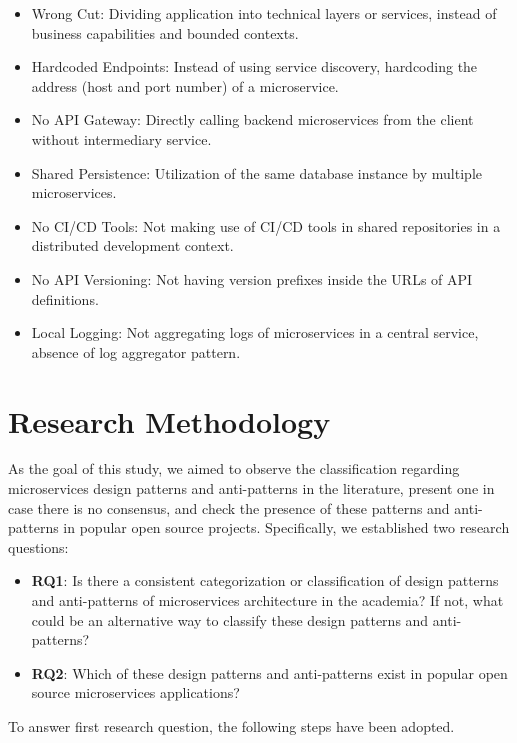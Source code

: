 \documentclass[11pt,a4paper,twocolumn]{article}
\begin{document}
\begin{itemize}
    \item Wrong Cut: Dividing application into technical layers or services, instead of business capabilities and bounded contexts.
    \item Hardcoded Endpoints: Instead of using service discovery, hardcoding the address (host and port number) of a microservice.
    \item No API Gateway: Directly calling backend microservices from the client without intermediary service.
    \item Shared Persistence: Utilization of the same database instance by multiple microservices.
    \item No CI/CD Tools: Not making use of CI/CD tools in shared repositories in a distributed development context.
    \item No API Versioning: Not having version prefixes inside the URLs of API definitions.
    \item Local Logging: Not aggregating logs of microservices in a central service, absence of log aggregator pattern.
\end{itemize}

\section{Research Methodology}
\label{sec:research_method}

As the goal of this study, we aimed to observe the classification regarding microservices design patterns and anti-patterns in the literature, present one in case there is no consensus, and check the presence of these patterns and anti-patterns in popular open source projects.
Specifically, we established two research questions:
\begin{itemize}
    \item \textbf{RQ1}: Is there a consistent categorization or classification of design patterns and anti-patterns of microservices architecture in the academia?
    If not, what could be an alternative way to classify these design patterns and anti-patterns?
    
    \item \textbf{RQ2}: Which of these design patterns and anti-patterns exist in popular open source microservices applications?
\end{itemize}

To answer first research question, the following steps have been adopted.
\end{document}
